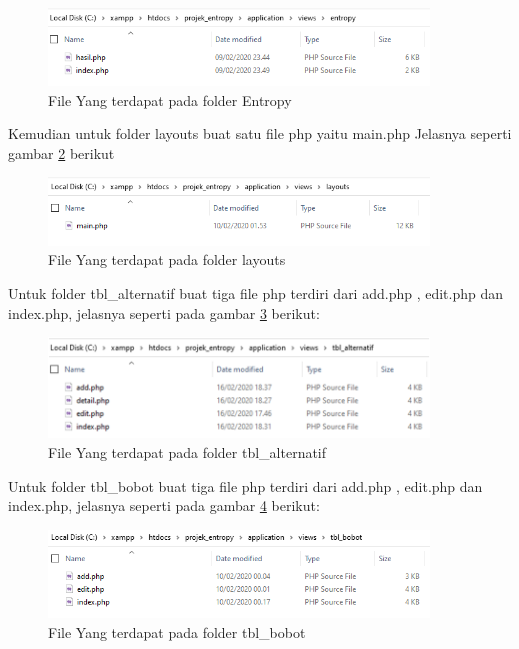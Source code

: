 \begin{figure}[!htbp]
	\centerline{\includegraphics[width=0.90\textwidth]{figures/dir/5.png}}
	\caption{File Yang terdapat pada folder Entropy}
	\label{dir5}
\end{figure}

Kemudian untuk folder layouts buat satu file php yaitu main.php
Jelasnya seperti gambar \ref{dir6} berikut


\begin{figure}[!htbp]
	\centerline{\includegraphics[width=0.90\textwidth]{figures/dir/6.png}}
	\caption{File Yang terdapat pada folder layouts}
	\label{dir6}
\end{figure}

Untuk folder tbl\_alternatif buat tiga file php terdiri dari add.php , edit.php dan index.php, jelasnya seperti pada gambar \ref{dir7} berikut:

\begin{figure}[!htbp]
	\centerline{\includegraphics[width=0.90\textwidth]{figures/dir/7.png}}
	\caption{File Yang terdapat pada folder tbl\_alternatif}
	\label{dir7}
\end{figure}

Untuk folder tbl\_bobot buat tiga file php terdiri dari add.php , edit.php dan index.php, jelasnya seperti pada gambar \ref{dir8} berikut:

\begin{figure}[!htbp]
	\centerline{\includegraphics[width=0.90\textwidth]{figures/dir/8.png}}
	\caption{File Yang terdapat pada folder tbl\_bobot}
	\label{dir8}
\end{figure}

